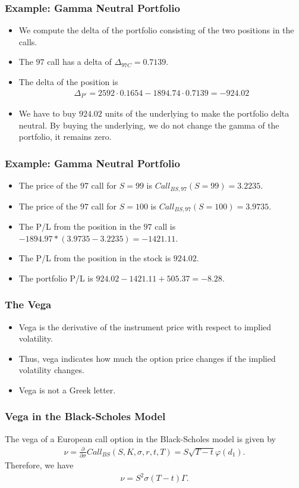 \begin{frame}[fragile]
\frametitle{Example: Gamma Neutral Portfolio}
\begin{itemize}
  \item We compute the delta of the portfolio consisting of the two positions in
  the calls.
  \item The $97$ call has a delta of $\Delta_{97C}=0.7139$.
  \item The delta of the position is
  \begin{align*}
    \Delta_{P'} = 2592 \cdot 0.1654 - 1894.74 \cdot 0.7139 = -924.02
  \end{align*}
  \item We have to buy $924.02$ units of the underlying to make the portfolio
  delta neutral. By buying the underlying, we do not change the gamma of the
  portfolio, it remains zero.
\end{itemize}
\end{frame}

\begin{frame}[fragile]
\frametitle{Example: Gamma Neutral Portfolio}
\begin{itemize}
  \item The price of the $97$ call for $S=99$ is $Call_{BS,97}(S=99)=3.2235$.
  \item The price of the $97$ call for $S=100$ is $Call_{BS,97}(S=100)=3.9735$.
  \item The P/L from the position in the $97$ call is
  $-1894.97*(3.9735-3.2235)=-1421.11$.
  \item The P/L from the position in the stock is $924.02$.
  \item The portfolio P/L is $924.02-1421.11+505.37=-8.28.$
\end{itemize}
\end{frame}

\begin{frame}[fragile]
\frametitle{The Vega}
\begin{itemize}
  \item Vega is the derivative of the instrument price with respect to
  implied volatility.
  \item Thus, vega indicates how much the option price changes if the implied
  volatility changes.
  \item Vega is not a Greek letter.
\end{itemize}
\end{frame}

\begin{frame}[fragile]
\frametitle{Vega in the Black-Scholes Model}
The vega of a European call option in the Black-Scholes model is given by
\begin{align*}
  \nu = \frac{\partial}{\partial \sigma}Call_{BS}(S,K,\sigma,r,t,T) =
  S\sqrt{T-t} \varphi(d_1).
\end{align*}
Therefore, we have
\begin{align*}
  \nu = S^2 \sigma (T-t) \Gamma.
\end{align*}
\end{frame}

